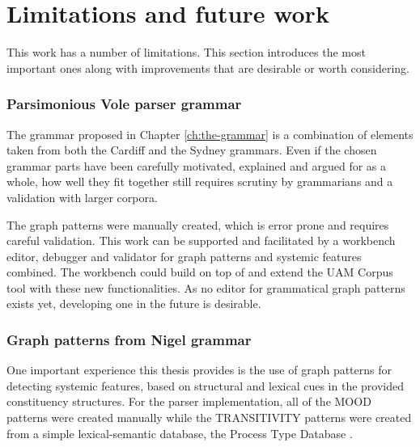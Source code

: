 \section{Limitations and future work}
\label{sec:future-work}

    This work has a number of limitations. This section introduces the most important ones along with improvements that are desirable or worth considering.
    
\subsubsection{Parsimonious Vole parser grammar}
    
    The grammar proposed in Chapter \ref{ch:the-grammar} is a combination of elements taken from both the Cardiff and the Sydney grammars. %
    Even if the chosen grammar parts have been carefully motivated, explained and argued for as a whole, how well they fit together still requires scrutiny by grammarians and a validation with larger corpora. 

    
    The graph patterns were manually created, which is error prone and requires careful validation. This work can be supported and facilitated by a workbench editor, debugger and validator for graph patterns and systemic features combined. The workbench could build on top of and extend the UAM Corpus tool with these new functionalities. As no editor for grammatical graph patterns exists yet, developing one in the future is desirable.

\subsubsection{Graph patterns from Nigel grammar}

    One important experience this thesis provides is the use of graph patterns for detecting systemic features, based on structural and lexical cues in the provided constituency structures. For the parser implementation, all of the MOOD patterns were created manually while the TRANSITIVITY patterns were created from a simple lexical-semantic database, the Process Type Database \citep{Neale2002}. 
    
